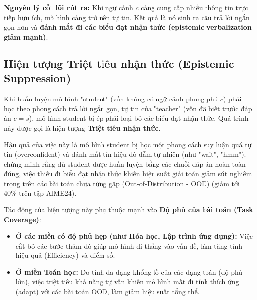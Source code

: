 \documentclass[12pt,a4paper]{report}
\begin{document}
\textbf{Nguyên lý cốt lõi rút ra:} Khi ngữ cảnh $c$ càng cung cấp nhiều thông tin trực tiếp hữu ích, mô hình càng trở nên tự tin. Kết quả là nó sinh ra câu trả lời ngắn gọn hơn và \textbf{đánh mất đi các biểu đạt nhận thức (epistemic verbalization giảm mạnh)}. 

\subsection{Hiện tượng Triệt tiêu nhận thức (Epistemic Suppression)}
Khi huấn luyện mô hình "student" (vốn không có ngữ cảnh phong phú $c$) phải học theo phong cách trả lời ngắn gọn, tự tin của "teacher" (vốn đã biết trước đáp án $c=s$), mô hình student bị ép phải loại bỏ các biểu đạt nhận thức. Quá trình này được gọi là hiện tượng \textbf{Triệt tiêu nhận thức}.

Hậu quả của việc này là mô hình student bị học một phong cách suy luận quá tự tin (overconfident) và đánh mất tín hiệu dò dẫm tự nhiên (như "wait", "hmm"). \cite{kim2026degrade} chứng minh rằng dù student được huấn luyện bằng các chuỗi đáp án hoàn toàn đúng, việc thiếu đi biểu đạt nhận thức khiến hiệu suất giải toán giảm sút nghiêm trọng trên các bài toán chưa từng gặp (Out-of-Distribution - OOD) (giảm tới 40\% trên tập AIME24). 

Tác động của hiện tượng này phụ thuộc mạnh vào \textbf{Độ phủ của bài toán (Task Coverage)}:
\begin{itemize}
    \item \textbf{Ở các miền có độ phủ hẹp (như Hóa học, Lập trình ứng dụng):} Việc cắt bỏ các bước thăm dò giúp mô hình đi thẳng vào vấn đề, làm tăng tính hiệu quả (Efficiency) và điểm số.
    \item \textbf{Ở miền Toán học:} Do tính đa dạng khổng lồ của các dạng toán (độ phủ lớn), việc triệt tiêu khả năng tự vấn khiến mô hình mất đi tính thích ứng (adapt) với các bài toán OOD, làm giảm hiệu suất tổng thể.
\end{itemize}

%
\end{document}
